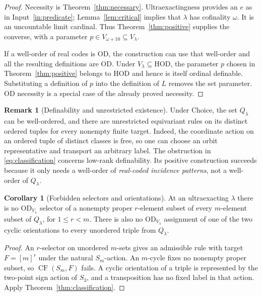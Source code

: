 \documentclass[11pt,letterpaper]{article}
\theoremstyle{definition}
\newtheorem{corollary}[definition]{Corollary}
\newtheorem{remark}[definition]{Remark}
\numberwithin{equation}{section}
\newcommand{\HOD}{\mathrm{HOD}}
\newcommand{\OD}{\mathrm{OD}}
\newcommand{\CF}{\operatorname{CF}}
\begin{document}
\begin{proof}
Necessity is Theorem~\ref{thm:necessary}. Ultraexactingness provides an $e$ as in Input~\ref{in:predicate}; Lemma~\ref{lem:critical} implies that $\lambda$ has cofinality $\omega$. It is an uncountable limit cardinal. Thus Theorem~\ref{thm:positive} supplies the converse, with a parameter $p\in V_{\omega+10}\subseteq V_\lambda$.

If a well-order of real codes is OD, the construction can use that well-order and all the resulting definitions are OD. Under $V_\lambda\subseteq\HOD$, the parameter $p$ chosen in Theorem~\ref{thm:positive} belongs to HOD and hence is itself ordinal definable. Substituting a definition of $p$ into the definition of $L$ removes the set parameter. OD necessity is a special case of the already proved necessity.
\end{proof}

\begin{remark}[Definability and unrestricted existence]
Under Choice, the set $Q_\lambda$ can be well-ordered, and there are unrestricted equivariant rules on its distinct ordered tuples for every nonempty finite target. Indeed, the coordinate action on an ordered tuple of distinct classes is free, so one can choose an orbit representative and transport an arbitrary label. The obstruction in \eqref{eq:classification} concerns low-rank definability. Its positive construction succeeds because it only needs a well-order of \emph{real-coded incidence patterns}, not a well-order of $Q_\lambda$.
\end{remark}

\begin{corollary}[Forbidden selectors and orientations]\label{cor:forbidden}
At an ultraexacting $\lambda$ there is no $\OD_{V_\lambda}$ selector of a nonempty proper $r$-element subset of every $m$-element subset of $Q_\lambda$, for $1\le r<m$. There is also no $\OD_{V_\lambda}$ assignment of one of the two cyclic orientations to every unordered triple from $Q_\lambda$.
\end{corollary}

\begin{proof}
An $r$-selector on unordered $m$-sets gives an admissible rule with target $F=[m]^r$ under the natural $S_m$-action. An $m$-cycle fixes no nonempty proper subset, so $\CF(S_m,F)$ fails. A cyclic orientation of a triple is represented by the two-point sign action of $S_3$, and a transposition has no fixed label in that action. Apply Theorem~\ref{thm:classification}.
\end{proof}
\end{document}
